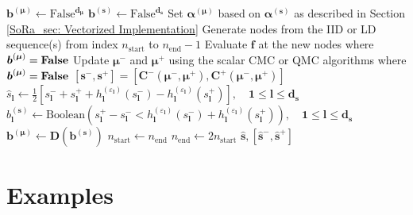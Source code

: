 \documentclass[graybox]{svmult}
\begin{document}
\begin{algorithm}[t]
\begin{algorithmic}
    \State $\boldsymbol{b}^{(\boldsymbol{\mu})} \gets \text{False}^{\boldsymbol{d}_{\boldsymbol{\mu}}}$ 
    \State $\boldsymbol{b}^{(\boldsymbol{s})} \gets \text{False}^{\boldsymbol{d}_{\boldsymbol{s}}}$ 
    \State Set $\boldsymbol{\alpha}^{(\boldsymbol{\mu})}$ based on $\boldsymbol{\alpha}^{(\boldsymbol{s})}$ as described in Section \ref{SoRa_sec: Vectorized Implementation}
     
        \State Generate nodes from the IID or LD sequence(s) from index $n_\text{start}$ to $n_\text{end}-1$
        \State Evaluate $\boldsymbol{f}$ at the new nodes where $\boldsymbol{b}^{(\boldsymbol{\mu})}=\textbf{\text{False}}$ 
        \State Update $\boldsymbol{\mu}^-$ and $\boldsymbol{\mu}^+$ using the scalar CMC or QMC algorithms where $\boldsymbol{b}^{(\boldsymbol{\mu})}=\textbf{\text{False}}$
        \State $[\boldsymbol{s}^-,\boldsymbol{s}^+] = \left[\boldsymbol{C}^-(\boldsymbol{\mu}^-,\boldsymbol{\mu}^+),\boldsymbol{C}^+(\boldsymbol{\mu}^-,\boldsymbol{\mu}^+)\right]$ 
        \State $\hat{s}_{\boldsymbol{l}} \gets \frac{1}{2}\left[s_{\boldsymbol{l}}^-+s_{\boldsymbol{l}}^++h^{(\varepsilon_{\boldsymbol{l}})}_{\boldsymbol{l}}(s_{\boldsymbol{l}}^-)-h^{(\varepsilon_{\boldsymbol{l}})}_{\boldsymbol{l}}(s_{\boldsymbol{l}}^+)\right], \quad\boldsymbol{1} \leq \boldsymbol{l} \leq \boldsymbol{d}_{\boldsymbol{s}}$ 
        \State $b^{(\boldsymbol{s})}_{\boldsymbol{l}} \gets \text{Boolean}\left(s_{\boldsymbol{l}}^+-s_{\boldsymbol{l}}^- < h^{(\varepsilon_{\boldsymbol{l}})}_{\boldsymbol{l}}(s_{\boldsymbol{l}}^-)+h^{(\varepsilon_{\boldsymbol{l}})}_{\boldsymbol{l}}(s_{\boldsymbol{l}}^+)\right),\quad \boldsymbol{1} \leq \boldsymbol{l} \leq \boldsymbol{d}_{\boldsymbol{s}}$ 
        \State $\boldsymbol{b}^{(\boldsymbol{\mu})} \gets \boldsymbol{D}\left(\boldsymbol{b}^{(\boldsymbol{s})}\right)$
        \State $n_\text{start} \gets n_\text{end}$
        \State $n_\text{end} \gets 2n_\text{start}$
    \EndWhile
    \State \Return $\hat{\boldsymbol{s}},[\hat{\boldsymbol{s}}^-,\hat{\boldsymbol{s}}^+]$
    \end{algorithmic}
\end{algorithm}

\section{Examples} \label{SoRa_sec:examples}
\end{document}
